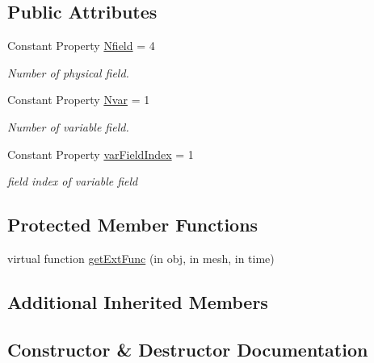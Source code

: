 \subsection*{Public Attributes}
\begin{DoxyCompactItemize}
\item 
Constant Property \hyperlink{class_adv_abstract_var_flow3d_ab5fcb7fe49c1215c05b30044e5c8e21c}{Nfield} = 4
\begin{DoxyCompactList}\small\item\em Number of physical field. \end{DoxyCompactList}\item 
Constant Property \hyperlink{class_adv_abstract_var_flow3d_a54a5d63c06d105c2e727381b2ff10de1}{Nvar} = 1
\begin{DoxyCompactList}\small\item\em Number of variable field. \end{DoxyCompactList}\item 
Constant Property \hyperlink{class_adv_abstract_var_flow3d_a385e2d69864aaff7936b3971724a858f}{var\+Field\+Index} = 1
\begin{DoxyCompactList}\small\item\em field index of variable field \end{DoxyCompactList}\end{DoxyCompactItemize}
\subsection*{Protected Member Functions}
\begin{DoxyCompactItemize}
\item 
virtual function \hyperlink{class_adv_abstract_var_flow3d_a7e025df8fe5bdf6f48f5a2ef72fe2c1b}{get\+Ext\+Func} (in obj, in mesh, in time)
\end{DoxyCompactItemize}
\subsection*{Additional Inherited Members}


\subsection{Constructor \& Destructor Documentation}
\mbox{\label{class_adv_abstract_var_flow3d_aa5e5f21952f1cd7a2006cd55a5c87f6a}} 
